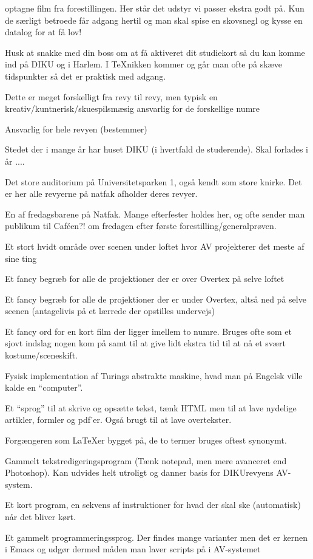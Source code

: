\documentclass[10pt,a4paper,danish]{article}
\begin{document}
\begin{description}
  optagne film fra forestillingen.
  Her står det udstyr vi passer ekstra godt på.
  Kun de særligt betroede får adgang hertil og man skal spise en skovsnegl og
  kysse en datalog for at få lov!
\item[Adgang:] Husk at snakke med din boss om at få aktiveret dit studiekort så du kan komme
  ind på DIKU og i Harlem. I TeXnikken kommer og går man ofte på skæve
  tidspunkter så det er praktisk med adgang.
\item[Instruktør:] Dette er meget forskelligt fra revy til revy, men typisk en
  kreativ/kuntnerisk/skuespilsmæsig ansvarlig for de forskellige numre
\item[Boss:] Ansvarlig for hele revyen (bestemmer)
\item[Universitetsparken 1:] Stedet der i mange år har huset DIKU (i hvertfald
  de studerende). Skal forlades i år ....
\item[Store UP1:] Det store auditorium på Universitetsparken 1, også
  kendt som store knirke. Det er her alle revyerne på natfak afholder deres revyer.
\item[Caféen?!:] En af fredagsbarene på Natfak. Mange efterfester holdes her, og
  ofte sender man publikum til Caféen?! om fredagen efter første
  forestilling/generalprøven.
\item[Overtex:] Et stort hvidt område over scenen under loftet hvor AV
  projekterer det meste af sine ting
\item[Højtex:] Et fancy begræb for alle de projektioner der er over Overtex på
  selve loftet
\item[Lavtex:] Et fancy begræb for alle de projektioner der er under Overtex,
  altså ned på selve scenen (antagelivis på et lærrede der opstilles undervejs)
\item[Fisk:] Et fancy ord for en kort film der ligger imellem to numre.
  Bruges ofte som et sjovt indslag nogen kom på samt til at give lidt ekstra tid
  til at nå et svært kostume/sceneskift.
\item[Datamat:] Fysisk implementation af Turings abstrakte maskine, hvad man på
  Engelsk ville kalde en ``computer''.
\item[\LaTeX:] Et ``sprog'' til at skrive og opsætte tekst, tænk HTML men til at
  lave nydelige artikler, formler og pdf'er. Også brugt til at lave overtekster.
\item[\TeX:] Forgængeren som \LaTeX er bygget på, de to termer bruges oftest
  synonymt.
\item[Emacs:] Gammelt tekstredigeringsprogram (Tænk notepad, men mere avanceret
  end Photoshop). Kan udvides helt utroligt og danner basis for DIKUrevyens AV-system.
\item[Script:] Et kort program, en sekvens af instruktioner for hvad der skal
  ske (automatisk) når det bliver kørt.
\item[Lisp] Et gammelt programmeringssprog. Der findes mange varianter men det
  er kernen i Emacs og udgør dermed måden man laver scripts på i AV-systemet
\end{description}
\end{document}
